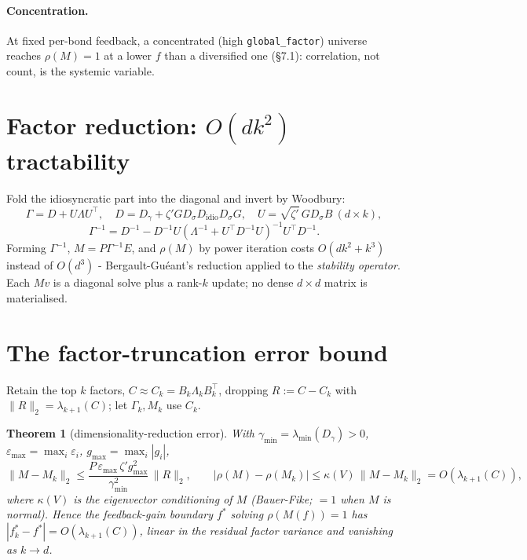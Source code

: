 \documentclass[11pt]{article}
\newtheorem{theorem}{Theorem}
\newcommand{\eps}{\varepsilon}
\newcommand{\code}[1]{\texttt{#1}}
\newcommand{\Gam}{\Gamma}
\newcommand{\Mmat}{M}
\begin{document}
\paragraph{Concentration.}
At fixed per-bond feedback, a concentrated (high \code{global\_factor}) universe
reaches $\rho(\Mmat)=1$ at a lower $f$ than a diversified one (\S7.1): correlation,
not count, is the systemic variable.

\section{Factor reduction: $O(dk^2)$ tractability}

Fold the idiosyncratic part into the diagonal and invert by Woodbury:
%
\[
  \Gam=D+U\Lambda U^{\!\top},\quad D=D_\gamma+\zeta'GD_\sigma D_{\mathrm{idio}}D_\sigma G,\quad
  U=\sqrt{\zeta'}\,GD_\sigma B\ (d\times k),
\]
\[
  \Gam^{-1}=D^{-1}-D^{-1}U(\Lambda^{-1}+U^{\!\top}D^{-1}U)^{-1}U^{\!\top}D^{-1}.
\]
%
Forming $\Gam^{-1}$, $\Mmat=P\Gam^{-1}E$, and $\rho(\Mmat)$ by power iteration costs
$O(dk^2+k^3)$ instead of $O(d^3)$ - Bergault-Gu\'eant's reduction applied to the
\emph{stability operator}. Each $\Mmat v$ is a diagonal solve plus a rank-$k$ update;
no dense $d\times d$ matrix is materialised.

\section{The factor-truncation error bound}

Retain the top $k$ factors, $C\approx C_k=B_k\Lambda_kB_k^{\!\top}$, dropping
$R:=C-C_k$ with $\|R\|_2=\lambda_{k+1}(C)$; let $\Gam_k,\Mmat_k$ use $C_k$.

\begin{theorem}[dimensionality-reduction error]
With $\gamma_{\min}=\lambda_{\min}(D_\gamma)>0$, $\eps_{\max}=\max_i\eps_i$,
$g_{\max}=\max_i|g_i|$,
%
\[
  \|\Mmat-\Mmat_k\|_2\le \frac{P\,\eps_{\max}\,\zeta' g_{\max}^2}{\gamma_{\min}^2}\,\|R\|_2,
  \qquad
  |\rho(\Mmat)-\rho(\Mmat_k)|\le \kappa(V)\,\|\Mmat-\Mmat_k\|_2=O(\lambda_{k+1}(C)),
\]
%
where $\kappa(V)$ is the eigenvector conditioning of $\Mmat$ (Bauer-Fike; $=1$ when
$\Mmat$ is normal). Hence the feedback-gain boundary $f^*$ solving $\rho(\Mmat(f))=1$
has $|f^*_k-f^*|=O(\lambda_{k+1}(C))$, linear in the residual factor variance and
vanishing as $k\to d$.
\end{theorem}
\end{document}
